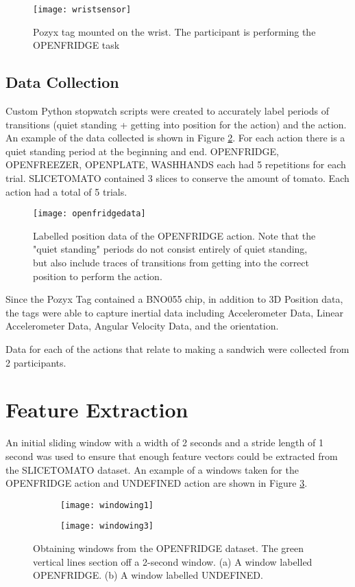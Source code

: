\begin{figure}[ht]
    \centering
    \texttt{[image: wristsensor]}
    \caption{Pozyx tag mounted on the wrist. The participant is performing the 
    OPENFRIDGE task
    }
    \label{fig:wristsensor}
\end{figure}

\subsection{Data Collection}
Custom Python stopwatch scripts were created to accurately label periods of 
transitions (quiet standing + getting into position for the action) and the action.
An example of the data collected is shown in Figure \ref{fig:openfridgedata}. 
For each action there is a quiet standing period at the beginning and end. 
OPENFRIDGE, OPENFREEZER, OPENPLATE, WASHHANDS each had 5 repetitions for each trial.
SLICETOMATO contained 3 slices to conserve the amount of tomato.
Each action had a total of 5 trials. 

\begin{figure}[ht]
    \centering
    \texttt{[image: openfridgedata]}
    \caption{Labelled position data of the OPENFRIDGE action. Note that the "quiet standing"
    periods do not consist entirely of quiet standing, but also include traces of 
    transitions from getting into the correct position to perform the action. 
    }
    \label{fig:openfridgedata}
\end{figure}

Since the Pozyx Tag contained a BNO055 chip, in addition to 3D Position data, the
tags were able to capture inertial data including Accelerometer Data, 
Linear Accelerometer Data, Angular Velocity Data, and the orientation.

Data for each of the actions that relate to making a sandwich were collected from 
2 participants.

\section{Feature Extraction}
An initial sliding window with a width of 2 seconds and a stride length of 1 second
was used to ensure that enough feature vectors could be extracted from the SLICETOMATO dataset.
An example of a windows taken for the OPENFRIDGE action and UNDEFINED action 
are shown in Figure \ref{fig:windows}.

\begin{figure}[ht]
    \centering
    \begin{subfigure}{\textwidth}
        \texttt{[image: windowing1]}
        \caption{}
    \end{subfigure}
    \begin{subfigure}{\textwidth}
        \texttt{[image: windowing3]}
        \caption{}
    \end{subfigure}
    \caption{Obtaining windows from the OPENFRIDGE dataset. The green vertical
    lines section off a 2-second window. (a) A window
    labelled OPENFRIDGE. (b) A window labelled UNDEFINED.
    }
    \label{fig:windows}
\end{figure}

